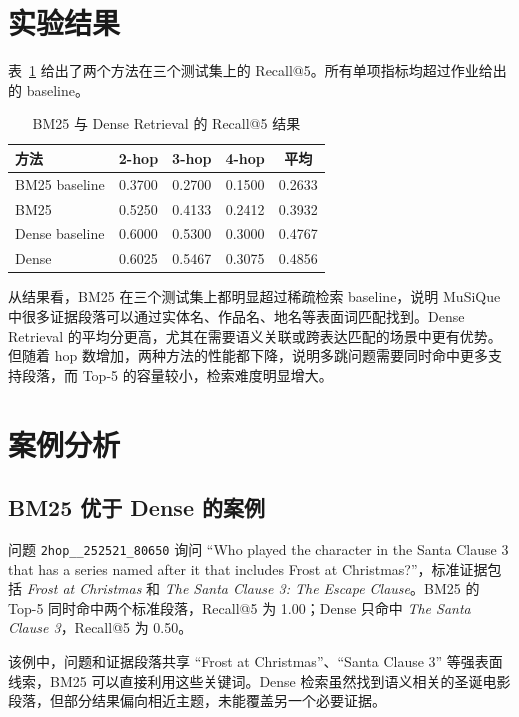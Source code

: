 \documentclass[12pt,letterpaper]{article}
\begin{document}
\section{实验结果}

表~\ref{tab:results} 给出了两个方法在三个测试集上的 Recall@5。所有单项指标均超过作业给出的 baseline。

\begin{table}[htbp]
\centering
\begin{tabular}{lcccc}
\toprule
方法 & 2-hop & 3-hop & 4-hop & 平均 \\
\midrule
BM25 baseline & 0.3700 & 0.2700 & 0.1500 & 0.2633 \\
BM25 & 0.5250 & 0.4133 & 0.2412 & 0.3932 \\
\midrule
Dense baseline & 0.6000 & 0.5300 & 0.3000 & 0.4767 \\
Dense & 0.6025 & 0.5467 & 0.3075 & 0.4856 \\
\bottomrule
\end{tabular}
\caption{BM25 与 Dense Retrieval 的 Recall@5 结果}
\label{tab:results}
\end{table}

从结果看，BM25 在三个测试集上都明显超过稀疏检索 baseline，说明 MuSiQue 中很多证据段落可以通过实体名、作品名、地名等表面词匹配找到。Dense Retrieval 的平均分更高，尤其在需要语义关联或跨表达匹配的场景中更有优势。但随着 hop 数增加，两种方法的性能都下降，说明多跳问题需要同时命中更多支持段落，而 Top-5 的容量较小，检索难度明显增大。

\section{案例分析}

\subsection{BM25 优于 Dense 的案例}

问题 \texttt{2hop\_\_252521\_80650} 询问 ``Who played the character in the Santa Clause 3 that has a series named after it that includes Frost at Christmas?''，标准证据包括 \emph{Frost at Christmas} 和 \emph{The Santa Clause 3: The Escape Clause}。BM25 的 Top-5 同时命中两个标准段落，Recall@5 为 1.00；Dense 只命中 \emph{The Santa Clause 3}，Recall@5 为 0.50。

该例中，问题和证据段落共享 ``Frost at Christmas''、``Santa Clause 3'' 等强表面线索，BM25 可以直接利用这些关键词。Dense 检索虽然找到语义相关的圣诞电影段落，但部分结果偏向相近主题，未能覆盖另一个必要证据。
\end{document}
